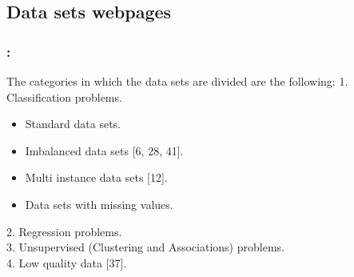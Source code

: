 \documentclass{beamer}
\begin{document}
\begin{CJK*}{UTF8}{bsmi}
\subsection{Data sets webpages}



\begin{frame}
	\frametitle{\insertsection : \insertsubsection}
	\begin{block}{The categories in which the data sets are divided are the following: }
		1.	Classification problems.
		\begin{itemize}
			\item Standard data sets.
			\item Imbalanced data sets [6, 28, 41].
			\item Multi instance data sets [12].
			\item Data sets with missing values.
		\end{itemize}
		2.	Regression problems.\\
		3.	Unsupervised (Clustering and Associations) problems.\\
		4.	Low quality data [37].
	\end{block}
\end{frame}


\end{CJK*}
\end{document}
